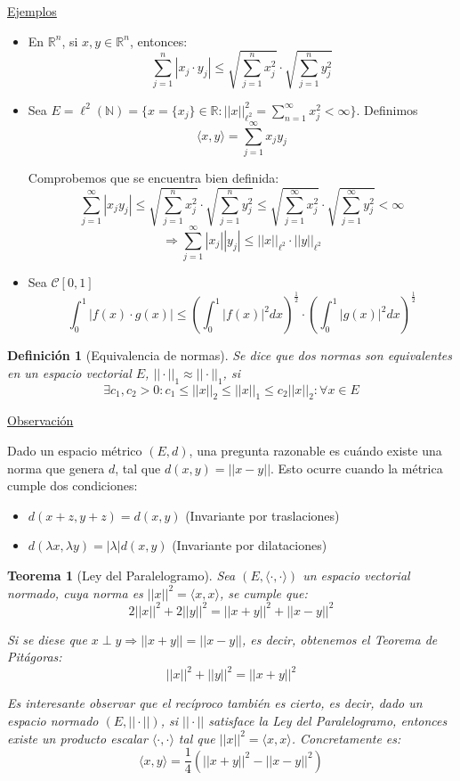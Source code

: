 \documentclass[10pt,a4paper,openright]{book}
\theoremstyle{break}
\newtheorem*{defi}{Definición}
\newtheorem*{theo}{Teorema}
\begin{document}
\underline{Ejemplos}
\begin{itemize}
\item En $\mathbb{R}^n$, si $x,y \in \mathbb{R}^n$, entonces:
$$\sum_{j=1}^{n} |x_j \cdot y_j | \leq \sqrt{\sum_{j=1}^{n} x_j^2} \cdot\sqrt{\sum_{j=1}^{n} y_j^2} $$

\item Sea $E = \ell^2 (\mathbb{N}) = \{x= \{x_j\} \in \mathbb{R} : ||x||^2_{\ell^2} = \sum_{n=1}^{\infty} x_j^2 < \infty\}$. Definimos 
$$\langle x,y \rangle = \sum_{j=1}^{\infty} x_j y_j$$

Comprobemos que se encuentra bien definida:
$$\sum_{j=1}^{\infty} |x_j y_j | \leq \sqrt{\sum_{j=1}^{n} x_j^2} \cdot\sqrt{\sum_{j=1}^{n} y_j^2} \leq \sqrt{\sum_{j=1}^{\infty} x_j^2} \cdot\sqrt{\sum_{j=1}^{\infty} y_j^2}  < \infty $$
$$\Rightarrow\sum_{j=1}^{\infty} |x_j|| y_j | \leq ||x||_{\ell^2} \cdot ||y||_{\ell^2}$$

\item Sea $\mathcal{C}[0,1]$
$$\int_{0}^{1} |f(x) \cdot g(x)| \leq \left( \int_{0}^{1} |f(x)|^2 dx \right)^\frac{1}{2} \cdot \left( \int_{0}^{1} |g(x)|^2 dx \right)^\frac{1}{2} $$
\end{itemize}

\begin{defi}[Equivalencia de normas]
Se dice que dos normas son equivalentes en un espacio vectorial $E$, $|| \cdot ||_1 \approx || \cdot ||_1$, si 
$$\exists c_1,c_2 > 0 : c_1 \leq ||x||_2 \leq ||x||_1 \leq c_2 ||x||_2 : \forall x \in E$$
\end{defi}

\underline{Observación}

Dado un espacio métrico $(E,d)$, una pregunta razonable es cuándo existe una norma que genera $d$, tal que $d(x,y) = ||x-y||$. Esto ocurre cuando la métrica cumple dos condiciones:
\begin{itemize}
\item $d(x+z,y+z) = d(x,y)$ (Invariante por traslaciones)

\item $d(\lambda x, \lambda y) = |\lambda | d(x,y)$ (Invariante por dilataciones)
\end{itemize}

\begin{theo}[Ley del Paralelogramo]
Sea $(E, \langle \cdot , \cdot \rangle)$ un espacio vectorial normado, cuya norma es $||x||^2 = \langle x,x\rangle$, se cumple que:
$$2||x||^2 + 2||y||^2 = ||x+y||^2 + ||x-y||^2$$

Si se diese que $x \perp y \Rightarrow ||x+y|| = ||x-y||$, es decir, obtenemos el Teorema de Pitágoras:
$$||x||^2 + ||y||^2 = ||x+y||^2$$

Es interesante observar que el recíproco también es cierto, es decir, dado un espacio normado $(E, || \cdot ||)$, si $|| \cdot ||$ satisface la Ley del Paralelogramo, entonces existe un producto escalar $\langle \cdot , \cdot \rangle$ tal que $||x||^2 = \langle x,x\rangle$. Concretamente es:
$$\langle x,y\rangle = \frac{1}{4} \left(||x+y||^2 - ||x-y||^{2}\right)$$
\end{theo}
\end{document}
